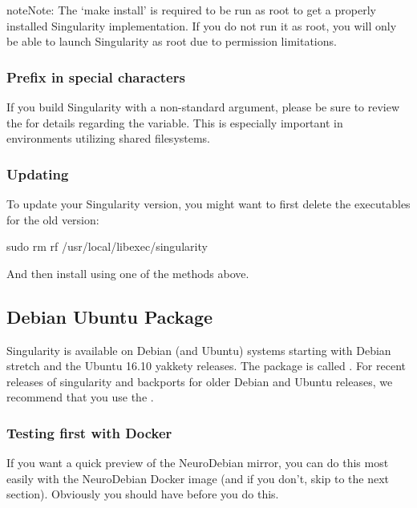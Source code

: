 \documentclass[letterpaper,10pt,english]{sphinxmanual}
\begin{document}
\begin{sphinxadmonition}{note}{Note:}
The ‘make install’ is required to be run as root to get a properly installed Singularity implementation. If you do not run it as root, you will only be able to launch Singularity as root due to permission limitations.
\end{sphinxadmonition}


\subsubsection{Prefix in special characters}
\label{\detokenize{installation:prefix-in-special-characters}}
If you build Singularity with a non-standard  argument, please be sure to review the  for details regarding the  variable. This is especially important in environments utilizing shared filesystems.


\subsubsection{Updating}
\label{\detokenize{installation:updating}}
To update your Singularity version, you might want to first delete the executables for the old version:

%
\begin{sphinxVerbatim}[commandchars=\\\{\}]
sudo rm \PYGZhy{}rf /usr/local/libexec/singularity
\end{sphinxVerbatim}

And then install using one of the methods above.


\subsection{Debian Ubuntu Package}
\label{\detokenize{installation:debian-ubuntu-package}}
Singularity is available on Debian (and Ubuntu) systems starting with Debian stretch and the Ubuntu 16.10 yakkety releases.
The package is called . For recent releases of singularity and backports for older Debian and Ubuntu releases,
we recommend that you use the .


\subsubsection{Testing first with Docker}
\label{\detokenize{installation:testing-first-with-docker}}
If you want a quick preview of the NeuroDebian mirror, you can do this most easily with the NeuroDebian Docker image (and if you don’t, skip to the next section). Obviously you should have  before you do this.
\end{document}

